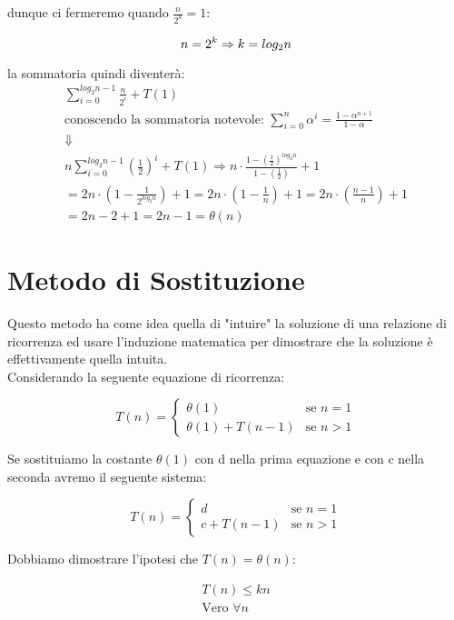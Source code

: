 \documentclass[a4paper, 12pt]{article} %
\begin{document}
dunque ci fermeremo quando $\frac{n}{2^k} = 1$:

$$
n = 2^{k} \Rightarrow k = log_{2} n  \\
$$

la sommatoria quindi diventerà:
\begin{gather*}
  \sum_{i = 0}^{log_{2}n - 1} \frac{n}{2^i} + T(1) \\
  \text{conoscendo la sommatoria notevole: $\sum_{i = 0}^{n} \alpha^{i} = \frac{1-\alpha^{n+1}}{1 - \alpha}$} \\
  \Downarrow \\
  n \sum_{i = 0}^{log_{2}n-1} (\frac{1}{2})^{i} + T(1) \Rightarrow n \cdot \frac{1 - (\frac{1}{2})^{log_{2}n}}{1 - (\frac{1}{2})} + 1 \\
  = 2n \cdot (1 - \frac{1}{2^{log_{2}n}}) + 1 = 2n \cdot (1 - \frac{1}{n}) + 1 = 2n \cdot (\frac{n - 1}{n}) + 1 \\
  = 2n - 2 + 1 = 2n - 1 = \theta(n)
\end{gather*} 

\section*{Metodo di Sostituzione}

Questo metodo ha come idea quella di "intuire" la soluzione di una
relazione di ricorrenza ed usare l'induzione matematica per dimostrare
che la soluzione è effettivamente quella intuita. \\

Considerando la seguente equazione di ricorrenza:

$$
T(n) = \begin{cases}
  \theta(1) & \text{se $n=1$} \\
  \theta(1) + T(n-1) & \text{se $n > 1$}
\end{cases}
$$

Se sostituiamo la costante $\theta(1)$ con d nella prima equazione e con
c nella seconda avremo il seguente sistema:

$$
T(n) = \begin{cases}
  d & \text{se $n=1$} \\
  c + T(n-1) & \text{se $n > 1$}
\end{cases}
$$

Dobbiamo dimostrare l'ipotesi che $T(n) = \theta(n)$:

\begin{gather*}
  T(n) \leq kn \\
  \text{Vero $\forall n$}
\end{gather*}
\end{document}
